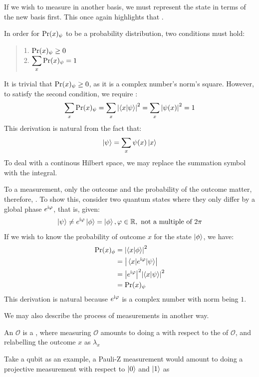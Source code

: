 If we wish to measure in another basis, we must represent the state in terms of the new basis first. This once again highlights that . \par
In order for $\text{Pr}(x)_\psi$ to be a probability distribution, two conditions must hold:
\begin{quote}
    1. $\text{Pr}(x)_\psi \ge 0$ \\
    2. $\displaystyle \sum_{x} \text{Pr}(x)_\psi = 1$
\end{quote}
It is trivial that $\text{Pr}(x)_\psi \ge 0$, as it is a complex number's norm's square. However, to satisfy the second condition, we require :
$$\sum_{x} \text{Pr}(x)_\psi = \sum_{x} \abs{\braket{x}{\psi}}^2 = \sum_{x} \abs{\psi(x)}^2 = 1$$
This derivation is natural from the fact that:
$$\ket{\psi} = \sum_{x} \psi(x)\ket{x}$$
To deal with a continous Hilbert space, we may replace the summation symbol with the integral. \par
To a measurement, only the outcome and the probability of the outcome matter, therefore, . To show this, consider two quantum states where they only differ by a global phase $e^{\mathrm{i} \varphi}$, that is, given:
$$\ket{\psi} \ne e^{\mathrm{i} \varphi}\ket{\phi} = \ket{\phi}, \varphi \in \mathbb{R}, \text{ not a multiple of } 2\pi$$
If we wish to know the probability of outcome $x$ for the state $\ket{\phi}$, we have:
\begin{align*}
    \text{Pr}(x)_\phi &= \abs{\braket{x}{\phi}}^2 \\
    &= \abs{\mel{x}{e^{\mathrm{i}\varphi}}{\psi}} \\
    &= \abs{e^{\mathrm{i} \varphi}}^2 \abs{\braket{x}{\psi}}^2 \\
    &= \text{Pr}(x)_\psi
\end{align*}
This derivation is natural because $e^{\mathrm{i} \varphi}$ is a complex number with norm being $1$. \par
We may also describe the process of measurements in another way.
\begin{definition}
    An  $\mathcal{O}$ is a , where measuring $\mathcal{O}$ amounts to doing a  with respect to the  of $\mathcal{O}$, and relabelling the outcome $x$ as $\lambda_x$
\end{definition}
Take a qubit as an example, a Pauli-Z measurement would amount to doing a projective measurement with respect to $\ket{0}$ and $\ket{1}$ as
